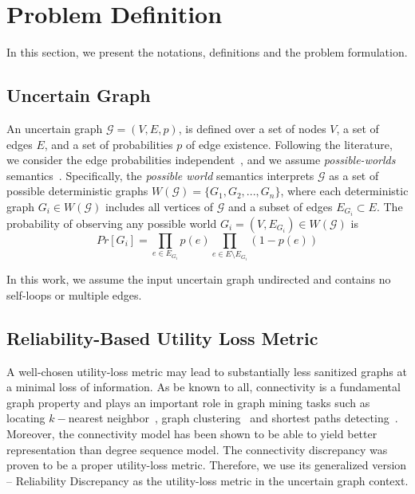 \section{Problem Definition}
\label{sec:notation}

In this section, we present the notations, definitions and the problem formulation.  

\subsection{Uncertain Graph}
An uncertain graph $\mathcal{G}=(V,E,\mathit{p})$, is defined over a set of nodes $V$, a set of edges $E$, and a set of probabilities $\mathit{p}$ of edge existence. Following the literature, we consider the edge probabilities independent~\cite{Potamias_K_2010,Zhao_Detecting_2014,Jin_Distance_2011}, and we assume \emph{possible-worlds} semantics~\cite{Colbourn_Colbourn_1987}. Specifically, the \emph{possible world} semantics interprets $\mathcal{G}$ as a set of possible deterministic graphs 
$W(\mathcal{G}) = \{G_1, G_2, ..., G_n\}$, where each deterministic graph $G_i \in W(\mathcal{G})$ includes all vertices of $\mathcal{G}$ 
and a subset of edges $E_{G_i} \subset E$.  
The probability of observing any possible world $G_i=(V,E_{G_i}) \in W(\mathcal{G})$ is    
\begin{equation*}
    Pr[G_i]=\prod_{e \in E_{G_i}} {\mathit{p}(e)} \prod_{e \in E \setminus E_{G_i}} (1-\mathit{p}(e))
\end{equation*}

In this work, we assume the input uncertain graph undirected and contains no self-loops or multiple edges. 


\subsection{Reliability-Based Utility Loss Metric}
A well-chosen utility-loss metric may lead to substantially less sanitized graphs at a minimal loss of information. 
As be known to all, connectivity is a fundamental graph property and plays an important role in graph mining tasks such as locating $k-$nearest neighbor~\cite{Potamias_K_2010}, graph clustering~\cite{Asthana_Predicting_2004} and shortest paths detecting~\cite{Zhao_Detecting_2014}. Moreover, the connectivity model has been shown to be able to yield better representation than degree sequence model. The connectivity discrepancy was proven to be a proper utility-loss metric. Therefore, we use its generalized version -- Reliability Discrepancy as the utility-loss metric in the uncertain graph context. 
 

